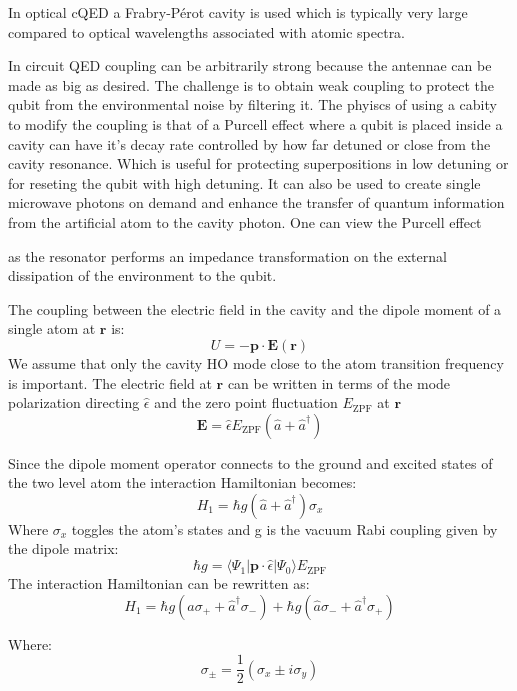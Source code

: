 \documentclass[12pt]{article}
\numberwithin{equation}{subsection}
\newcommand\ask[1]{
{%
}
}
\newcommand\page[1]{
{
}
}
\begin{document}
In optical cQED a Frabry-Pérot cavity is used which is typically very large compared to optical wavelengths associated with atomic spectra. 

\page{73}
In circuit QED coupling can be arbitrarily strong because the antennae can be made as big as desired. The challenge is to obtain weak coupling to protect the qubit from the environmental noise by filtering it. The phyiscs of using a cabity to modify the coupling is that of a Purcell effect where a qubit is placed inside a cavity can have it's decay rate controlled by how far detuned or close from the cavity resonance. Which is useful for protecting superpositions in low detuning or for reseting the qubit with high detuning.
It can also be used to create single microwave photons on demand and enhance the transfer of quantum information from the artificial atom to the cavity photon.
One can view the Purcell effect
\ask{Eu preciso entender esse efeito? Ele menciona como se já fosse conhecido me parece com o efeito de um transformador numa impedancia pela descrição a seguir}
as the resonator performs an impedance transformation on the external dissipation of the environment to the qubit.

\page{74}
The coupling between the electric field in the cavity and the dipole moment of a single atom at $\mathbf r$ is:
\begin{equation}
    U=-\mathbf p \cdot \mathbf E(\mathbf r)
\end{equation}
We assume that only the cavity HO mode close to the atom transition frequency  is important.
The electric field at $\mathbf r$ can be written in terms of the mode polarization directing $\hat \epsilon$ and the zero point fluctuation $ E_{\textrm{ZPF}}$ at $\mathbf r$
\begin{equation}
\mathbf E = \hat \epsilon E_{\textrm{ZPF}}(\hat a+ \hat a^\dagger)
\end{equation}

Since the dipole moment operator connects to the ground and excited states of the two level atom the interaction Hamiltonian becomes:
\begin{equation}
    H_1 = \hbar g (\hat a+ \hat a^\dagger) \sigma_x
\end{equation}
Where $\sigma_x$ toggles the atom's states and g is the vacuum Rabi coupling given by the dipole matrix:
\begin{equation}
   \hbar g = \langle \Psi_1| \mathbf p \cdot \hat \epsilon |\Psi_0\rangle E_{\textrm{ZPF}} 
\end{equation}
The interaction Hamiltonian can be rewritten as:
\begin{equation}
    H_1 = \hbar g (\hat a\sigma_++ \hat a^\dagger\sigma_-)  +\hbar g (\hat a\sigma_-+ \hat a^\dagger\sigma_+)
    \label{eq:int-hamil}
\end{equation}
\page{75}
Where:
\begin{equation}
    \sigma_\pm = \frac{1}{2}(\sigma_x \pm i\sigma_y)
\end{equation}
\end{document}
